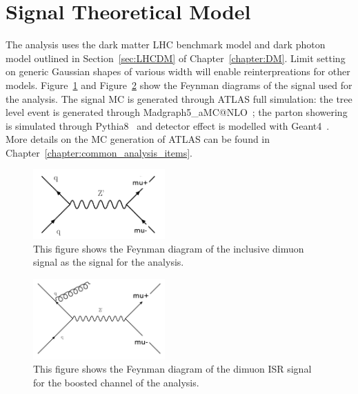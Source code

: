 \section{Signal Theoretical Model}
The analysis uses the dark matter LHC benchmark model and dark photon model outlined in Section~\ref{sec:LHCDM} of Chapter~\ref{chapter:DM}.
Limit setting on generic Gaussian shapes of various width will enable reinterpreations for other models.
Figure~\ref{fig:dimuonFeynmann} and Figure~\ref{fig:dimuonISRFeynmann} show the Feynman diagrams of the signal used for the analysis.
The signal MC is generated through ATLAS full simulation: the tree level event is generated through Madgraph5\_aMC@NLO~\cite{MG2014}; the parton showering is simulated through Pythia8~\cite{PYTHIA2008} and detector effect is modelled with Geant4~\cite{agostinelli2003geant4}. More details on the MC generation of ATLAS can be found in Chapter~\ref{chapter:common_analysis_items}.

\begin{figure}[!htb]
    \begin{center}
        \includegraphics[width=0.45\textwidth]{figures/chapter_dimuon/dimuonFeynman}
        \caption{
            This figure shows the Feynman diagram of the inclusive dimuon signal as the signal for the analysis. 
        }
    \label{fig:dimuonFeynmann}
    \end{center}
\end{figure}
\FloatBarrier

\begin{figure}[!htb]
    \begin{center}
        \includegraphics[width=0.45\textwidth]{figures/chapter_dimuon/dimuonISRFeynmann}
        \caption{
        This figure shows the Feynman diagram of the dimuon ISR signal for the boosted channel of the analysis. }
            \label{fig:dimuonISRFeynmann}
    \end{center}
\end{figure}
\FloatBarrier

